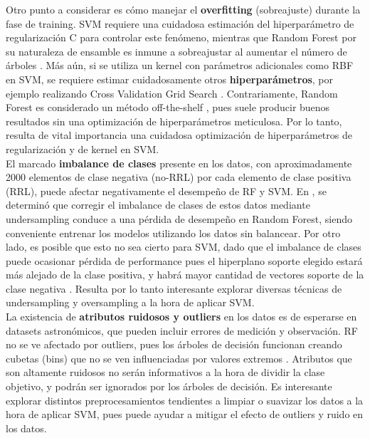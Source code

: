 Otro punto a considerar es cómo manejar el \textbf{overfitting} (sobreajuste) durante la fase de training. SVM requiere una cuidadosa estimación del hiperparámetro de regularización C para controlar este fenómeno, mientras que Random Forest por su naturaleza de ensamble es inmune a sobreajustar al aumentar el número de árboles \cite{rf}. Más aún, si se utiliza un kernel con parámetros adicionales como RBF en SVM, se requiere estimar cuidadosamente otros \textbf{hiperparámetros}, por ejemplo realizando Cross Validation Grid Search \cite{svm_practical}. Contrariamente, Random Forest es considerado un método off-the-shelf \cite{offshelf}, pues suele producir buenos resultados sin una optimización de hiperparámetros meticulosa. Por lo tanto, resulta de vital importancia una cuidadosa optimización de hiperparámetros de regularización y de kernel en SVM. \\

El marcado \textbf{imbalance de clases} presente en los datos, con aproximadamente 2000 elementos de clase negativa (no-RRL) por cada elemento de clase positiva (RRL), puede afectar negativamente el desempeño de RF y SVM. En \cite{jbc}, se determinó que corregir el imbalance de clases de estos datos mediante undersampling conduce a una pérdida de desempeño en Random Forest, siendo conveniente entrenar los modelos utilizando los datos sin balancear. Por otro lado, es posible que esto no sea cierto para SVM, dado que el imbalance de clases puede ocasionar pérdida de performance pues el hiperplano soporte elegido estará más alejado de la clase positiva, y habrá mayor cantidad de vectores soporte de la clase negativa \cite{imbalanced_svm}. Resulta por lo tanto interesante explorar diversas técnicas de undersampling y oversampling a la hora de aplicar SVM. \\

La existencia de \textbf{atributos ruidosos y outliers} en los datos es de esperarse en datasets astronómicos, que pueden incluir errores de medición y observación. RF no se ve afectado por outliers, pues los árboles de decisión funcionan creando cubetas (bins) que no se ven influenciadas por valores extremos \cite{statisticallearning}. Atributos que son altamente ruidosos no serán informativos a la hora de dividir la clase objetivo, y podrán ser ignorados por los árboles de decisión. Es interesante explorar distintos preprocesamientos tendientes a limpiar o suavizar los datos a la hora de aplicar SVM, pues puede ayudar a mitigar el efecto de outliers y ruido en los datos. \\

